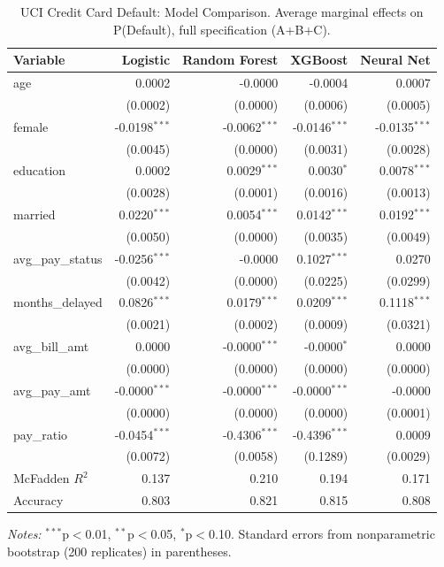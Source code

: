 \documentclass[12pt]{article}
\begin{document}
	\begin{table}[htbp]
		\centering
		\small
		\begin{threeparttable}
			\caption{UCI Credit Card Default: Model Comparison. Average marginal effects on P(Default), full specification (A+B+C).}
			\label{tab:credit_default_model_comparison}
			\begin{tabular}{lrrrr}
				\toprule
				Variable & Logistic & Random Forest & XGBoost & Neural Net \\
				\midrule
				age & 0.0002 & -0.0000 & -0.0004 & 0.0007 \\
				& (0.0002) & (0.0000) & (0.0006) & (0.0005) \\
				female & -0.0198$^{***}$ & -0.0062$^{***}$ & -0.0146$^{***}$ & -0.0135$^{***}$ \\
				& (0.0045) & (0.0000) & (0.0031) & (0.0028) \\
				education & 0.0002 & 0.0029$^{***}$ & 0.0030$^{*}$ & 0.0078$^{***}$ \\
				& (0.0028) & (0.0001) & (0.0016) & (0.0013) \\
				married & 0.0220$^{***}$ & 0.0054$^{***}$ & 0.0142$^{***}$ & 0.0192$^{***}$ \\
				& (0.0050) & (0.0000) & (0.0035) & (0.0049) \\
				\midrule
				avg\_pay\_status & -0.0256$^{***}$ & -0.0000 & 0.1027$^{***}$ & 0.0270 \\
				& (0.0042) & (0.0000) & (0.0225) & (0.0299) \\
				months\_delayed & 0.0826$^{***}$ & 0.0179$^{***}$ & 0.0209$^{***}$ & 0.1118$^{***}$ \\
				& (0.0021) & (0.0002) & (0.0009) & (0.0321) \\
				\midrule
				avg\_bill\_amt & 0.0000 & -0.0000$^{***}$ & -0.0000$^{*}$ & 0.0000 \\
				& (0.0000) & (0.0000) & (0.0000) & (0.0000) \\
				avg\_pay\_amt & -0.0000$^{***}$ & -0.0000$^{***}$ & -0.0000$^{***}$ & -0.0000 \\
				& (0.0000) & (0.0000) & (0.0000) & (0.0001) \\
				pay\_ratio & -0.0454$^{***}$ & -0.4306$^{***}$ & -0.4396$^{***}$ & 0.0009 \\
				& (0.0072) & (0.0058) & (0.1289) & (0.0029) \\
				\midrule
				McFadden $R^2$ & 0.137 & 0.210 & 0.194 & 0.171 \\
				Accuracy & 0.803 & 0.821 & 0.815 & 0.808 \\
				\bottomrule
			\end{tabular}
			\begin{tablenotes}
				\footnotesize
				\item \textit{Notes:} $^{***}$p$<$0.01, $^{**}$p$<$0.05, $^{*}$p$<$0.10. Standard errors from nonparametric bootstrap (200 replicates) in parentheses.
			\end{tablenotes}
		\end{threeparttable}
	\end{table}
	
\end{document}
